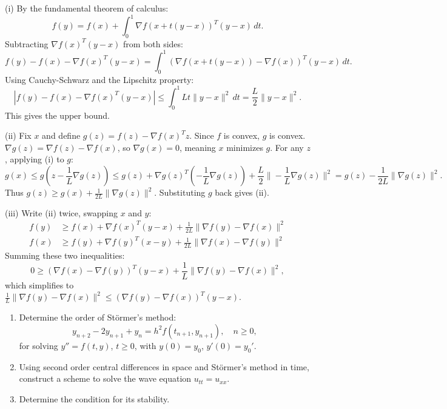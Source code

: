 \begin{solution}
(i) By the fundamental theorem of calculus:
\[
f(y) = f(x) + \int_0^1 \nabla f(x + t(y-x))^T (y-x) \, dt.
\]
Subtracting $\nabla f(x)^T (y-x)$ from both sides:
\[
f(y) - f(x) - \nabla f(x)^T(y-x) = \int_0^1 (\nabla f(x+t(y-x)) - \nabla f(x))^T (y-x) \, dt.
\]
Using Cauchy-Schwarz and the Lipschitz property:
\[
|f(y) - f(x) - \nabla f(x)^T(y-x)| \leq \int_0^1 L t \|y-x\|^2 \, dt = \frac{L}{2} \|y-x\|^2.
\]
This gives the upper bound.

(ii) Fix $x$ and define $g(z) = f(z) - \nabla f(x)^T z$. Since $f$ is convex, $g$ is convex. $\nabla g(z) = \nabla f(z) - \nabla f(x)$, so $\nabla g(x) = 0$, meaning $x$ minimizes $g$. For any $z$, applying (i) to $g$:
\[
g(x) \leq g(z - \frac{1}{L} \nabla g(z)) \leq g(z) + \nabla g(z)^T (-\frac{1}{L} \nabla g(z)) + \frac{L}{2} \|-\frac{1}{L} \nabla g(z)\|^2 = g(z) - \frac{1}{2L} \|\nabla g(z)\|^2.
\]
Thus $g(z) \geq g(x) + \frac{1}{2L} \|\nabla g(z)\|^2$. Substituting $g$ back gives (ii).

(iii) Write (ii) twice, swapping $x$ and $y$:
\begin{align*}
f(y) &\geq f(x) + \nabla f(x)^T(y-x) + \frac{1}{2L} \|\nabla f(y) - \nabla f(x)\|^2 \\
f(x) &\geq f(y) + \nabla f(y)^T(x-y) + \frac{1}{2L} \|\nabla f(x) - \nabla f(y)\|^2
\end{align*}
Summing these two inequalities:
\[
0 \geq (\nabla f(x) - \nabla f(y))^T(y-x) + \frac{1}{L} \|\nabla f(y) - \nabla f(x)\|^2,
\]
which simplifies to $\frac{1}{L} \|\nabla f(y) - \nabla f(x)\|^2 \leq (\nabla f(y) - \nabla f(x))^T(y-x)$.
\end{solution}

\begin{exercise}
\label{applied:2014:10}

\begin{enumerate}
\item[(i)] Determine the order of St\"ormer's method:
\[
y_{n+2}-2y_{n+1}+y_{n}=h^{2}f(t_{n+1},y_{n+1}),\quad n\geq 0,
\]
for solving $y''=f(t,y)$, $t\geq 0$, with $y(0)=y_{0}$, $y'(0)=y_{0}'$.
\item[(ii)] Using second order central differences in space and St\"ormer's method in time, construct a scheme to solve the wave equation $u_{tt}=u_{xx}$.
\item[(iii)] Determine the condition for its stability.
\end{enumerate}
\end{exercise}

